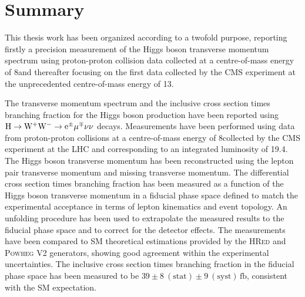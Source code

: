 \chapter*{Summary}
\thispagestyle{empty}

This thesis work has been organized according to a twofold purpose, reporting firstly a precision measurement of the Higgs boson transverse momentum spectrum using proton-proton collision data collected at a centre-of-mass energy of 8\TeV and thereafter focusing on the first data collected by the CMS experiment at the unprecedented centre-of-mass energy of 13\TeV.

The transverse momentum spectrum and the inclusive cross section times branching fraction for the Higgs boson production have been reported using $\rm{H}\to\rm{W^+W^-}\to e^{\pm} \mu^{\mp}\nu\nu$ decays. Measurements have been performed using data from proton-proton collisions at a centre-of-mass energy of 8\TeV collected by the CMS experiment at the LHC and corresponding to an integrated luminosity of 19.4\ifb. The Higgs boson transverse momentum has been reconstructed using the lepton pair transverse momentum and missing transverse momentum. The differential cross section times branching fraction has been measured as a function of the Higgs boson transverse momentum in a fiducial phase space defined to match the experimental acceptance in terms of lepton kinematics and event topology. An unfolding procedure has been used to extrapolate the measured results to the fiducial phase space and to correct for the detector effects.
The measurements have been compared to SM theoretical estimations provided by the \textsc{HRed} and \textsc{Powheg V2} generators, showing good agreement within the experimental uncertainties. The inclusive cross section times branching fraction in the fiducial phase space has been measured to be $39\pm 8~(\mathrm{stat}) \pm 9~(\mathrm{syst})\,\mathrm{fb}$, consistent with the SM expectation.
